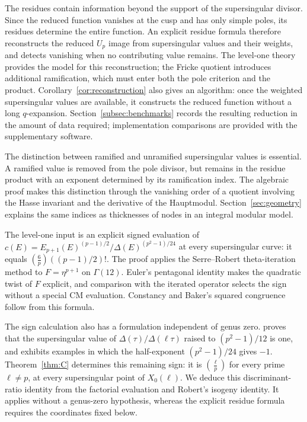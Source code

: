 \documentclass[11pt,a4paper]{article}
\numberwithin{equation}{section}
\theoremstyle{definition}
\theoremstyle{remark}
\begin{document}
The residues contain information beyond the support of the supersingular divisor.
Since the reduced function vanishes at the cusp and has only simple poles, its
residues determine the entire function. An explicit residue formula therefore
reconstructs the reduced $U_p$ image from supersingular values and their weights,
and detects vanishing when no contributing value remains. The level-one theory
provides the model for this reconstruction; the Fricke quotient introduces
additional ramification, which must enter both the pole criterion and the product.
Corollary~\ref{cor:reconstruction} also gives an algorithm: once the weighted
supersingular values are available, it constructs the reduced function without
a long $q$-expansion. Section~\ref{subsec:benchmarks} records the resulting
reduction in the amount of data required; implementation comparisons are
provided with the supplementary software.

The distinction between ramified and unramified supersingular values is essential.
A ramified value is removed from the pole divisor, but remains in the residue
product with an exponent determined by its ramification index. The algebraic proof
makes this distinction through the vanishing order of a quotient involving the Hasse
invariant and the derivative of the Hauptmodul. Section~\ref{sec:geometry} explains
the same indices as thicknesses of nodes in an integral modular model.

The level-one input is an explicit signed evaluation of
$c(E)=E_{p+1}(E)^{(p-1)/2}/\Delta(E)^{(p^2-1)/24}$ at every supersingular
curve: it equals $\left(\frac6p\right)((p-1)/2)!$. The proof applies the
Serre--Robert theta-iteration method to $F=\eta^{p+1}$ on $\Gamma(12)$.
Euler's pentagonal identity makes the quadratic twist of $F$ explicit,
and comparison with the iterated operator selects the sign without a
special CM evaluation. Constancy and Baker's squared congruence follow
from this formula.

The sign calculation also has a formulation independent of genus zero.
\citet[Theorem~1.2 and Remark~4]{Ono25} proves that the supersingular value of
$\Delta(\tau)/\Delta(\ell\tau)$ raised to $(p^2-1)/12$ is one, and exhibits
examples in which the half-exponent $(p^2-1)/24$ gives $-1$.
Theorem~\ref{thm:C} determines this remaining sign: it is
$\left(\frac{\ell}{p}\right)$ for every prime $\ell\ne p$, at every
supersingular point of $X_0(\ell)$. We deduce this discriminant-ratio
identity from the factorial evaluation and Robert's isogeny identity.
It applies without a genus-zero hypothesis, whereas the explicit residue
formula requires the coordinates fixed below.
\end{document}
